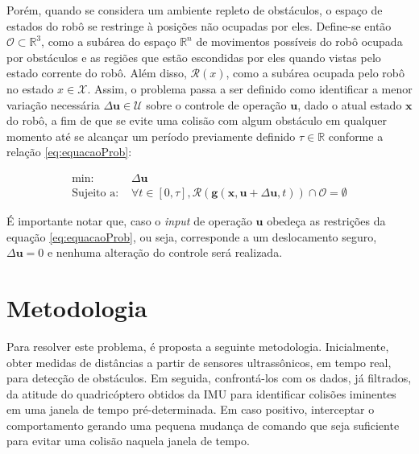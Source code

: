 \documentclass[a4paper, 12pt]{article}
\begin{document}
Porém, quando se considera um ambiente repleto de obstáculos, o espaço de estados do robô se restringe à posições não ocupadas por eles. Define-se então $\mathcal{O} \subset \mathbb{R}^3$, como a subárea do espaço $\mathbb{R}^n$ de movimentos possíveis do robô ocupada por obstáculos e as regiões que estão escondidas por eles quando vistas pelo estado corrente do robô. Além disso, $\mathcal{R}(x)$, como a subárea ocupada pelo robô no estado $x \in \mathcal{X}$. Assim, o problema passa a ser definido como identificar a menor variação necessária  $\Delta\mathbf{u} \in \mathcal{U}$ sobre o controle de operação $\mathbf{u}$, dado o atual estado $\mathbf{x}$ do robô, a fim de que se evite uma colisão com algum obstáculo em qualquer momento até se alcançar um período previamente definido $\tau \in \mathbb{R}$ conforme a relação \ref{eq:equacaoProb}:

\begin{equation}
\begin{aligned}
\text{min: }& \Delta\mathbf{u} \\
\text{Sujeito a: }& \forall t \in [0,\tau], \mathcal{R}(\mathbf{g}(\mathbf{x}, \mathbf{u}+\Delta\mathbf{u}, t)) \cap \mathcal{O} = \emptyset
\end{aligned}
\label{eq:equacaoProb}
\end{equation}



É importante notar que, caso o \textit{input} de operação $\mathbf{u}$ obedeça as restrições da equação \ref{eq:equacaoProb}, ou seja, corresponde a um deslocamento seguro, $\Delta\mathbf{u} = 0$ e nenhuma alteração do controle será realizada.

\newpage

\section{Metodologia}
\label{sec:meto}

Para resolver este problema, é proposta a seguinte metodologia. Inicialmente, obter medidas de distâncias a partir de sensores ultrassônicos, em tempo real, para detecção de obstáculos. Em seguida, confrontá-los com os dados, já filtrados, da atitude do quadricóptero obtidos da IMU para identificar colisões iminentes em uma janela de tempo pré-determinada. Em caso positivo, interceptar o comportamento gerando uma pequena mudança de comando que seja suficiente para evitar uma colisão naquela janela de tempo.
\end{document}
